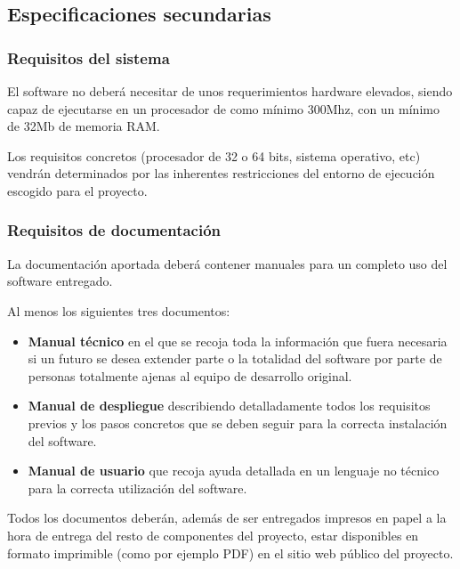 
\subsection{Especificaciones secundarias}

\subsubsection{Requisitos del sistema} 

El software no deberá necesitar de unos requerimientos hardware elevados, 
siendo capaz de ejecutarse en un procesador de como mínimo 300Mhz, con 
un mínimo de 32Mb de memoria RAM. 

Los requisitos concretos (procesador de 32 o 64 bits, sistema operativo, 
etc) vendrán determinados por las inherentes restricciones del entorno de 
ejecución escogido para el proyecto.

\subsubsection{Requisitos de documentación} 

La documentación aportada deberá contener manuales para un completo uso 
del software entregado.

Al menos los siguientes tres documentos:

\begin{itemize}
  \item \textbf{Manual técnico} en el que se recoja toda la información que 
	fuera necesaria si un futuro se desea extender parte o la totalidad 
	del software por parte de personas totalmente ajenas al equipo de 
	desarrollo original.
  \item \textbf{Manual de despliegue} describiendo detalladamente todos los 
	requisitos previos y los pasos concretos que se deben seguir para la 
	correcta instalación del software.
  \item \textbf{Manual de usuario} que recoja ayuda detallada en un lenguaje
	no técnico para la correcta utilización del software.
\end{itemize}

Todos los documentos deberán, además de ser entregados impresos en papel a la
hora de entrega del resto de componentes del proyecto, estar disponibles en
formato imprimible (como por ejemplo PDF) en el sitio web público del proyecto.
